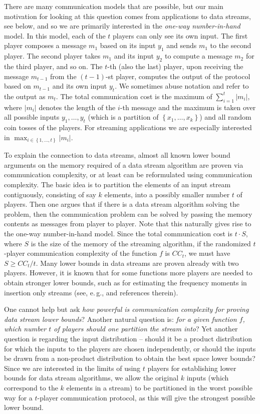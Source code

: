 \documentclass[11pt]{article}
\numberwithin{equation}{section}
\theoremstyle{definition}
\theoremstyle{plain}
\newcommand{\eg}{e.\,g.}
\newcommand{\set}[1]{{\left \{{#1} \right \}}}
\begin{document}
There are many communication models that are possible, but our main motivation for looking at this question comes from applications to data streams, see below, and so we are primarily interested in the \emph{one-way number-in-hand} model. In this model, each of the $t$ players can only see its own input. 
The first player composes a message $m_1$ based on its input $y_1$ and sends $m_1$ to the second player. 
The second player takes $m_1$ and its input $y_2$ to compute a message $m_2$ for the third player, and so on. 
The $t$-th (also the last) player, upon receiving the message $m_{t-1}$ from the $(t-1)$-st player, computes the output of the protocol based on $m_{t-1}$ and its own input $y_t$. We sometimes abuse notation and refer to the output as $m_t$. 
The total communication cost is the maximum of $\sum_{i=1}^{t} |m_i|$, where $|m_i|$ denotes the length of the $i$-th message and the maximum is taken over all possible inputs $y_1,\ldots, y_t$ (which is a partition of $\set{x_1, \ldots, x_k}$) and all random coin tosses of the players. 
For streaming applications we are especially interested in $\max_{i\in\set{1, \ldots, t}} |m_i|$. 

To explain the connection to data streams, almost all known lower bound arguments on the memory required of a data stream algorithm are proven via communication complexity, or at least can be reformulated using communication complexity. 
The basic idea is to partition the elements of an input stream contiguously, consisting of say $k$ elements, into a possibly smaller number $t$ of players. 
Then one argues that if there is a data stream algorithm  solving the problem, then the communication problem can be solved by passing the memory contents as messages from player to player. 
Note that this naturally gives rise to the one-way number-in-hand model. 
Since the total communication cost is $t \cdot S$, where $S$ is the size of the memory of the streaming algorithm, if the randomized $t$-player communication complexity of the function $f$ is $CC_t$, we must have $S \geq CC_t/t$. 
Many lower bounds in data streams are proven already with two players.
However, it is known that for some functions more  players are needed to obtain stronger lower bounds, such as for estimating the frequency moments in insertion only streams (see, \eg,
 \cite{BarYossef:2004eya,wz12} and references therein). 

One cannot help but ask \emph{how powerful is communication complexity for proving data stream lower bounds}? Another natural question is: \emph{for a given function $f$, which number $t$ of players should one partition the stream into}? 
Yet another question is regarding the input distribution -- should it be a product distribution for which the inputs to the players are chosen independently, 
or should the inputs be drawn from a non-product distribution to obtain the best space lower bounds? 
Since we are interested in the limits of using $t$ players for establishing lower bounds for data stream algorithms, we allow the original $k$ inputs (which correspond to the $k$ elements in a stream) to be partitioned in the worst possible way for a $t$-player communication protocol, as this will give the strongest possible lower bound.
\end{document}
